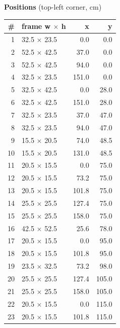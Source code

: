 \documentclass[a4paper,landscape,10pt]{article}
\begin{document}
\begin{minipage}[t]{0.25\textwidth}
\vspace{8pt}
{\bfseries Positions} (top-left corner, cm)\\[2pt]
\tiny
\begin{tabular}{@{}r l r r@{}}
\toprule
\# & frame w $\times$ h & x & y \\
\midrule
1 & 32.5 $\times$ 23.5 & 0.0 & 0.0 \\
2 & 52.5 $\times$ 42.5 & 37.0 & 0.0 \\
3 & 52.5 $\times$ 42.5 & 94.0 & 0.0 \\
4 & 32.5 $\times$ 23.5 & 151.0 & 0.0 \\
5 & 32.5 $\times$ 42.5 & 0.0 & 28.0 \\
6 & 32.5 $\times$ 42.5 & 151.0 & 28.0 \\
7 & 32.5 $\times$ 23.5 & 37.0 & 47.0 \\
8 & 32.5 $\times$ 23.5 & 94.0 & 47.0 \\
9 & 15.5 $\times$ 20.5 & 74.0 & 48.5 \\
10 & 15.5 $\times$ 20.5 & 131.0 & 48.5 \\
11 & 20.5 $\times$ 15.5 & 0.0 & 75.0 \\
12 & 20.5 $\times$ 15.5 & 73.2 & 75.0 \\
13 & 20.5 $\times$ 15.5 & 101.8 & 75.0 \\
14 & 25.5 $\times$ 25.5 & 127.4 & 75.0 \\
15 & 25.5 $\times$ 25.5 & 158.0 & 75.0 \\
16 & 42.5 $\times$ 52.5 & 25.6 & 78.0 \\
17 & 20.5 $\times$ 15.5 & 0.0 & 95.0 \\
18 & 20.5 $\times$ 15.5 & 101.8 & 95.0 \\
19 & 23.5 $\times$ 32.5 & 73.2 & 98.0 \\
20 & 25.5 $\times$ 25.5 & 127.4 & 105.0 \\
21 & 25.5 $\times$ 25.5 & 158.0 & 105.0 \\
22 & 20.5 $\times$ 15.5 & 0.0 & 115.0 \\
23 & 20.5 $\times$ 15.5 & 101.8 & 115.0 \\
\bottomrule
\end{tabular}
\end{minipage}
\clearpage
\end{document}
